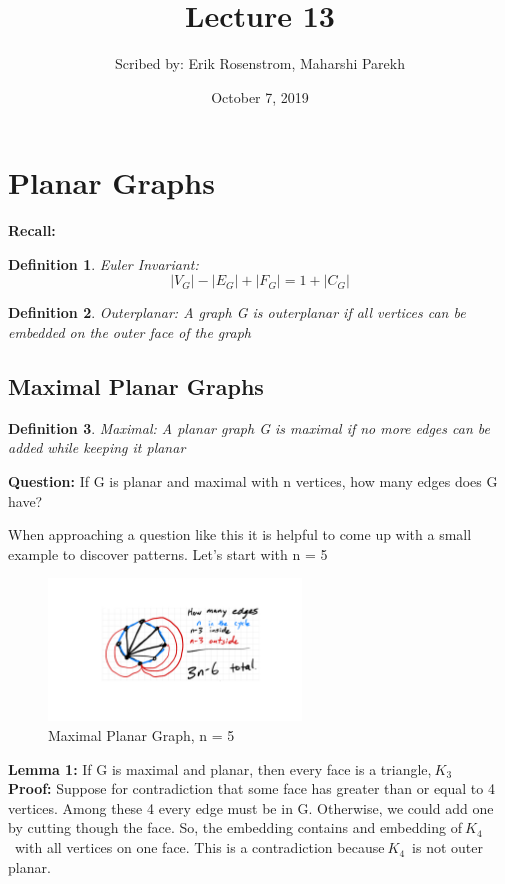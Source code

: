 \documentclass{article}
\title{Lecture 13}
\author{Scribed by: Erik Rosenstrom, Maharshi Parekh }
\date{October 7, 2019}
\begin{document}
\newtheorem{definition}{Definition}
\maketitle


\section{Planar Graphs}
\textbf{Recall:}

\begin{definition}{Euler Invariant: } 
$$|V_G| - |E_G| + |F_G| = 1 + |C_G|$$

\end{definition}
\begin{definition}{Outerplanar: }
A graph G is outerplanar if all vertices can be embedded on the outer face of the graph
\end{definition}

\subsection{Maximal Planar Graphs}
\begin{definition}{Maximal: }
A planar graph G is maximal if no more edges can be added while keeping it planar
\end{definition}


\textbf{Question:} If G is planar and maximal with n vertices, how many edges does G have?

When approaching a question like this it is helpful to come up with a small example to discover patterns. Let's start with n = 5

\begin{figure}[h!]
\centering
\includegraphics[width=0.6\textwidth]{"gt 1"}
\caption{Maximal Planar Graph, n = 5}
\end{figure}


\textbf{Lemma 1: }If G is maximal and planar, then every face is a triangle,$\ {K_3}$\\
\textbf{Proof:} Suppose for contradiction that some face has greater than or equal to 4 vertices. Among these 4 every edge must be in G. Otherwise, we could add one by cutting though the face. So, the embedding contains and embedding of$\ {K_4}$\ with all vertices on one face. This is a contradiction because$\ {K_4}$\ is not outer planar.\\
\end{document}
